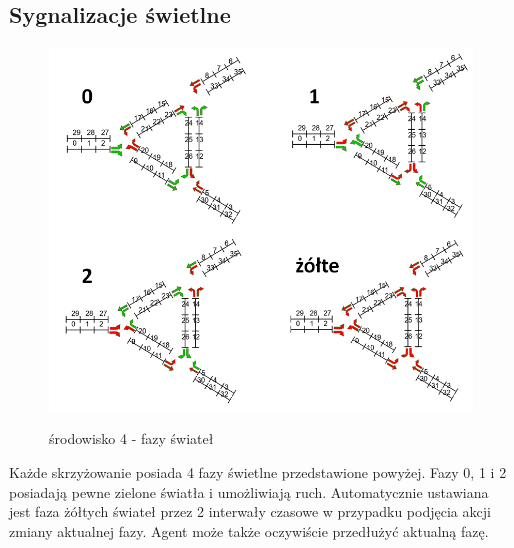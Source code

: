 \documentclass[12pt]{book}
\theoremstyle{plain}
\begin{document}
\subsection{Sygnalizacje świetlne}	
	\begin{figure}[H]
		\centering
		\includegraphics[width=14cm]{images/env_4_fazy}
		\label{fig:env_4_fazy}
		\caption{środowisko 4 - fazy świateł}
	\end{figure}\noindent
Każde skrzyżowanie posiada 4 fazy świetlne przedstawione powyżej. Fazy 0, 1 i 2 posiadają pewne zielone światła i umożliwiają ruch. Automatycznie ustawiana jest faza żółtych świateł przez 2 interwały czasowe w przypadku podjęcia akcji zmiany aktualnej fazy. Agent może także oczywiście przedłużyć aktualną fazę.
\end{document}
